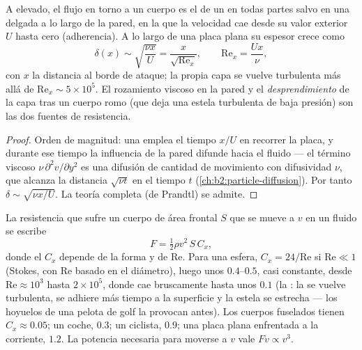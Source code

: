 \begin{proposition}\label{prop:b2:viscous-flows:bl}
A  elevado, el flujo en torno a un cuerpo es el de un
 en todas partes salvo en una delgada \emph{} a
lo largo de la pared, en la que la velocidad cae desde su valor exterior
$U$ hasta cero (adherencia). A lo largo de una placa plana su espesor crece como
\[
\delta(x) \sim \sqrt{\frac{\nu x}{U}} = \frac{x}{\sqrt{\mathrm{Re}_x}} ,
\qquad \mathrm{Re}_x = \frac{Ux}{\nu} ,
\]
con $x$ la distancia al borde de ataque; la propia capa se vuelve
turbulenta más allá de $\mathrm{Re}_x \sim 5 \times 10^5$. El rozamiento
viscoso en la pared y el \emph{desprendimiento} de la capa tras un cuerpo
romo (que deja una estela turbulenta de baja presión) son las dos fuentes
de resistencia.
\end{proposition}

\begin{proof}
Orden de magnitud: una  emplea el tiempo $x/U$ en
recorrer la placa, y durante ese tiempo la influencia de la pared difunde
hacia el fluido --- el término viscoso $\nu\,\partial^2v/\partial y^2$ es una
difusión de cantidad de movimiento con difusividad $\nu$, que alcanza la
distancia $\sqrt{\nu t}$ en el tiempo $t$ (\cref{ch:b2:particle-diffusion}). Por tanto $\delta \sim \sqrt{\nu x
/U}$. La teoría completa (de Prandtl) se admite.
\end{proof}

\begin{proposition}\label{prop:b2:viscous-flows:drag}
La resistencia que sufre un cuerpo de área frontal $S$ que se mueve a $v$
en un fluido se escribe
\[
F = \tfrac12\rho v^2\,S\,C_x ,
\]
donde el \emph{} $C_x$ depende de la forma y de
$\mathrm{Re}$. Para una esfera, $C_x = 24/\mathrm{Re}$ si $\mathrm{Re} \ll 1$ (Stokes,
con $\mathrm{Re}$ basado en el diámetro), luego unos $0.4$--$0.5$, casi
constante, desde $\mathrm{Re} \approx 10^3$ hasta $2 \times 10^5$, donde cae
bruscamente hasta unos $0.1$ (la \emph{}: la  se vuelve
turbulenta, se adhiere más tiempo a la superficie y la estela se estrecha
--- los hoyuelos de una pelota de golf la provocan antes). Los cuerpos
fuselados tienen $C_x \approx 0.05$; un coche, $0.3$; un ciclista, $0.9$; una placa plana enfrentada a la corriente,
$1.2$. La potencia necesaria para moverse a $v$ vale $Fv \propto v^3$.
\end{proposition}
\admitted

